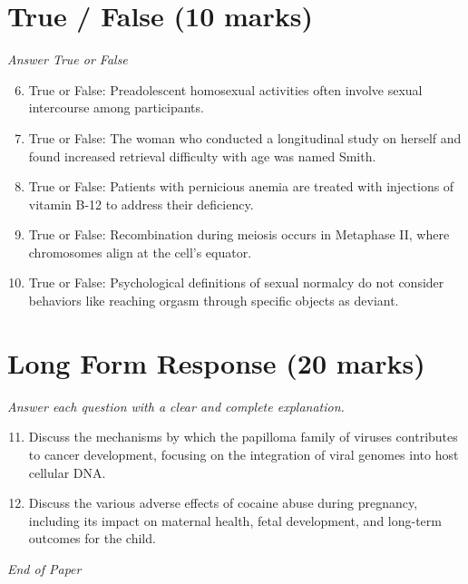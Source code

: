 \documentclass[12pt]{article}
\begin{document}
\section*{True / False (10 marks)}
\textit{Answer True or False}
\begin{enumerate}[label=\arabic*.]
\setcounter{enumi}{5}
\item True or False: Preadolescent homosexual activities often involve sexual intercourse among participants.
\item True or False: The woman who conducted a longitudinal study on herself and found increased retrieval difficulty with age was named Smith.
\item True or False: Patients with pernicious anemia are treated with injections of vitamin B-12 to address their deficiency.
\item True or False: Recombination during meiosis occurs in Metaphase II, where chromosomes align at the cell's equator.
\item True or False: Psychological definitions of sexual normalcy do not consider behaviors like reaching orgasm through specific objects as deviant.
\end{enumerate}

\section*{Long Form Response (20 marks)}
\textit{Answer each question with a clear and complete explanation.}
\begin{enumerate}[label=\arabic*.]
\setcounter{enumi}{10}
\item Discuss the mechanisms by which the papilloma family of viruses contributes to cancer development, focusing on the integration of viral genomes into host cellular DNA.
\item Discuss the various adverse effects of cocaine abuse during pregnancy, including its impact on maternal health, fetal development, and long-term outcomes for the child.
\end{enumerate}

\vfill
\noindent\textit{End of Paper}
\end{document}
